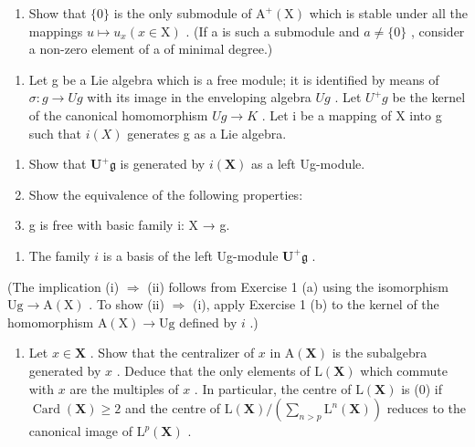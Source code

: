 \begin{enumerate}
\def\labelenumi{(\alph{enumi})}
\setcounter{enumi}{1}
\tightlist
\item
  Show that \(\{0\}\) is the only submodule of \(\mathrm{A}^{+}(\mathrm{X})\) which is stable under all the mappings \(u \mapsto u_{x} (x \in \mathrm{X})\) . (If a is such a submodule and \(a \neq \{0\}\) , consider a non-zero element of a of minimal degree.)
\end{enumerate}

\begin{enumerate}
\def\labelenumi{\arabic{enumi}.}
\setcounter{enumi}{1}
\tightlist
\item
  Let g be a Lie algebra which is a free module; it is identified by means of \(\sigma: g \to Ug\) with its image in the enveloping algebra \(Ug\) . Let \(U^{+}g\) be the kernel of the canonical homomorphism \(Ug \to K\) . Let i be a mapping of X into g such that \(i(X)\) generates g as a Lie algebra.
\end{enumerate}

\begin{enumerate}
\def\labelenumi{(\alph{enumi})}
\item
  Show that \(\mathbf{U}^{+}\mathfrak{g}\) is generated by \(i(\mathbf{X})\) as a left Ug-module.
\item
  Show the equivalence of the following properties:
\item
  g is free with basic family i: X → g.
\end{enumerate}

\begin{enumerate}
\def\labelenumi{(\roman{enumi})}
\setcounter{enumi}{1}
\tightlist
\item
  The family \(i\) is a basis of the left Ug-module \(\mathbf{U}^{+}\mathfrak{g}\) .
\end{enumerate}

(The implication (i) \(\Rightarrow\) (ii) follows from Exercise 1 (a) using the isomorphism \(\mathrm{Ug} \to \mathrm{A}(\mathrm{X})\) . To show (ii) \(\Rightarrow\) (i), apply Exercise 1 (b) to the kernel of the homomorphism \(\mathrm{A}(\mathrm{X}) \to \mathrm{Ug}\) defined by \(i\) .)

\begin{enumerate}
\def\labelenumi{\arabic{enumi}.}
\setcounter{enumi}{2}
\tightlist
\item
  Let \(x \in \mathbf{X}\) . Show that the centralizer of \(x\) in \(\mathrm{A}(\mathbf{X})\) is the subalgebra generated by \(x\) . Deduce that the only elements of \(\mathrm{L}(\mathbf{X})\) which commute with \(x\) are the multiples of \(x\) . In particular, the centre of \(\mathrm{L}(\mathbf{X})\) is (0) if \(\operatorname{Card}(\mathbf{X}) \geqslant 2\) and the centre of \(\mathrm{L}(\mathbf{X}) / \left( \sum_{n > p} \mathrm{L}^n(\mathbf{X}) \right)\) reduces to the canonical image of \(\mathrm{L}^p(\mathbf{X})\) .
\end{enumerate}


